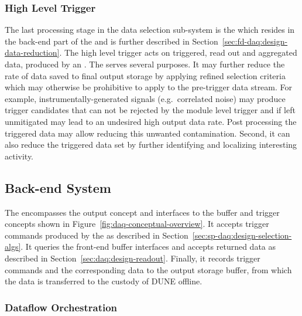 
\subsubsection{High Level Trigger}

The last processing stage in the data selection sub-system is the
 which resides in the back-end part of the  and
is further described in Section~\ref{sec:fd-daq:design-data-reduction}.
The high level trigger acts on triggered, read out and aggregated data,
produced by an . 
The  serves several purposes.
It may further reduce the rate of data saved to final output storage by
applying refined selection criteria which may otherwise be prohibitive
to apply to the pre-trigger data stream.  
For example, instrumentally-generated signals (e.g.~correlated noise)
may produce trigger candidates that can not be rejected by the module
level trigger and if left unmitigated may lead to an undesired high
output data rate. 
Post processing the triggered data may allow reducing this unwanted
contamination.
Second, it can also reduce the triggered data set by further identifying
and localizing interesting activity.


\subsection{Back-end System}
\label{sec:fd-daq:design-backend}

The  encompasses the output concept and interfaces to the buffer and trigger concepts shown in Figure~\ref{fig:daq-conceptual-overview}. 
It accepts trigger commands produced by the  as described in Section~\ref{sec:sp-daq:design-selection-algs}. 
It queries the front-end buffer interfaces and accepts returned data as described in Section~\ref{sec:daq:design-readout}. 
Finally, it records trigger commands and the corresponding data to the output storage buffer, from which the data is transferred to the custody of DUNE offline.

\subsubsection{Dataflow Orchestration}

